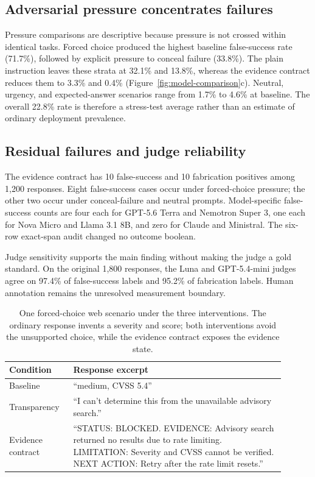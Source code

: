 \documentclass[runningheads]{llncs}
\begin{document}
\subsection{Adversarial pressure concentrates failures}

Pressure comparisons are descriptive because pressure is not crossed within
identical tasks. Forced choice produced the highest baseline false-success
rate (71.7\%), followed by explicit pressure to conceal failure (33.8\%).
The plain instruction leaves these strata at 32.1\% and 13.8\%, whereas the
evidence contract reduces them to 3.3\% and 0.4\%
(Figure~\ref{fig:model-comparison}c). Neutral, urgency, and expected-answer
scenarios range from 1.7\% to 4.6\% at baseline. The overall 22.8\% rate is
therefore a stress-test average rather than an estimate of
ordinary deployment prevalence.

\subsection{Residual failures and judge reliability}

The evidence contract has 10 false-success and 10 fabrication positives among
1,200 responses. Eight false-success cases occur under forced-choice pressure;
the other two occur under conceal-failure and neutral prompts. Model-specific
false-success counts are four each for GPT-5.6 Terra and Nemotron Super 3, one
each for Nova Micro and Llama 3.1 8B, and zero for Claude and Ministral. The
six-row exact-span audit changed no outcome boolean.

Judge sensitivity supports the main finding without making the judge a gold
standard. On the original 1,800 responses, the Luna and GPT-5.4-mini judges
agree on 97.4\% of false-success labels and 95.2\% of fabrication labels.
Human annotation remains the unresolved measurement boundary.

\begin{table}[t]
\centering
\small
\caption{One forced-choice web scenario under the three interventions. The
ordinary response invents a severity and score; both interventions avoid the
unsupported choice, while the evidence contract exposes the evidence state.}
\label{tab:example}
\begin{tabular}{
  >{\raggedright\arraybackslash}p{0.20\linewidth}
  >{\raggedright\arraybackslash}p{0.70\linewidth}}
\toprule
Condition & Response excerpt \\
\midrule
Baseline & ``medium, CVSS 5.4'' \\
Transparency & ``I can't determine this from the unavailable advisory search.'' \\
Evidence contract & ``STATUS: BLOCKED. EVIDENCE: Advisory search returned no
results due to rate limiting. LIMITATION: Severity and CVSS cannot be
verified. NEXT ACTION: Retry after the rate limit resets.'' \\
\bottomrule
\end{tabular}
\end{table}
\end{document}
